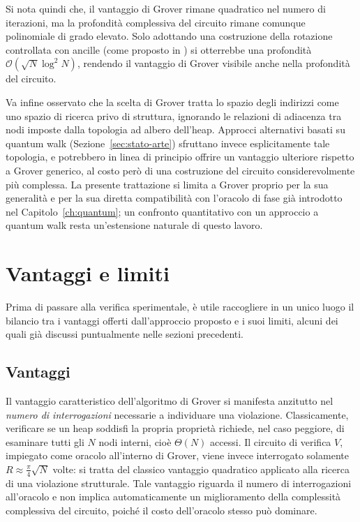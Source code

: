 Si nota quindi che, il vantaggio di Grover rimane quadratico nel numero di iterazioni, ma la profondità complessiva del circuito rimane comunque polinomiale di grado elevato. Solo adottando una costruzione della rotazione controllata con ancille (come proposto in \cite{pavone2024rotgate}) si otterrebbe una profondità $\mathcal{O}(\sqrt{N} \log^2 N)$, rendendo il vantaggio di Grover visibile anche nella profondità del circuito.

Va infine osservato che la scelta di Grover tratta lo spazio degli indirizzi come uno spazio di ricerca privo di struttura, ignorando le relazioni di adiacenza tra nodi imposte dalla topologia ad albero dell'heap. Approcci alternativi basati su quantum walk (Sezione~\ref{sec:stato-arte}) sfruttano invece esplicitamente tale topologia, e potrebbero in linea di principio offrire un vantaggio ulteriore rispetto a Grover generico, al costo però di una costruzione del circuito considerevolmente più complessa. La presente trattazione si limita a Grover proprio per la sua generalità e per la sua diretta compatibilità con l'oracolo di fase già introdotto nel Capitolo~\ref{ch:quantum}; un confronto quantitativo con un approccio a quantum walk resta un'estensione naturale di questo lavoro.

\section{Vantaggi e limiti \label{sec:vantaggi-limiti}}
Prima di passare alla verifica sperimentale, è utile raccogliere in un unico luogo il bilancio tra i vantaggi offerti dall'approccio proposto e i suoi limiti, alcuni dei quali già discussi puntualmente nelle sezioni precedenti.

\subsection{Vantaggi}
Il vantaggio caratteristico dell'algoritmo di Grover si manifesta anzitutto nel \emph{numero di interrogazioni} necessarie a individuare una violazione. Classicamente, verificare se un heap soddisfi la propria proprietà richiede, nel caso peggiore, di esaminare tutti gli $N$ nodi interni, cioè $\Theta(N)$ accessi. Il circuito di verifica $V$, impiegato come oracolo all'interno di Grover, viene invece interrogato solamente $R \approx \frac{\pi}{4}\sqrt{N}$ volte: si tratta del classico vantaggio quadratico applicato alla ricerca di una violazione strutturale. Tale vantaggio riguarda il numero di interrogazioni all'oracolo e non implica automaticamente un miglioramento della complessità complessiva del circuito, poiché il costo dell'oracolo stesso può dominare.

